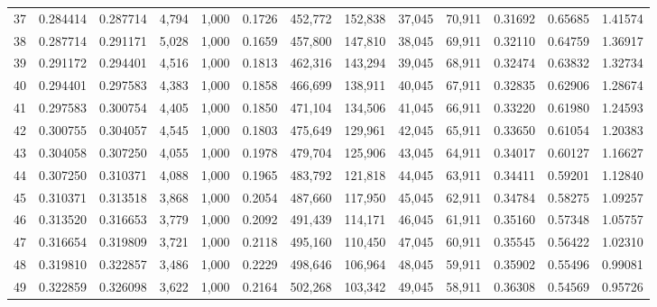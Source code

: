 \begin{tabular}{rrrrrrrrrrrrr}
37  &  0.284414 &  0.287714 &   4,794 &  1,000 &                                     0.1726 &  452,772 &  152,838 &   37,045 &   70,911 &  0.31692 &  0.65685 &  1.41574 \\
38  &  0.287714 &  0.291171 &   5,028 &  1,000 &                                     0.1659 &  457,800 &  147,810 &   38,045 &   69,911 &  0.32110 &  0.64759 &  1.36917 \\
39  &  0.291172 &  0.294401 &   4,516 &  1,000 &                                     0.1813 &  462,316 &  143,294 &   39,045 &   68,911 &  0.32474 &  0.63832 &  1.32734 \\
40  &  0.294401 &  0.297583 &   4,383 &  1,000 &                                     0.1858 &  466,699 &  138,911 &   40,045 &   67,911 &  0.32835 &  0.62906 &  1.28674 \\
41  &  0.297583 &  0.300754 &   4,405 &  1,000 &                                     0.1850 &  471,104 &  134,506 &   41,045 &   66,911 &  0.33220 &  0.61980 &  1.24593 \\
42  &  0.300755 &  0.304057 &   4,545 &  1,000 &                                     0.1803 &  475,649 &  129,961 &   42,045 &   65,911 &  0.33650 &  0.61054 &  1.20383 \\
43  &  0.304058 &  0.307250 &   4,055 &  1,000 &                                     0.1978 &  479,704 &  125,906 &   43,045 &   64,911 &  0.34017 &  0.60127 &  1.16627 \\
44  &  0.307250 &  0.310371 &   4,088 &  1,000 &                                     0.1965 &  483,792 &  121,818 &   44,045 &   63,911 &  0.34411 &  0.59201 &  1.12840 \\
45  &  0.310371 &  0.313518 &   3,868 &  1,000 &                                     0.2054 &  487,660 &  117,950 &   45,045 &   62,911 &  0.34784 &  0.58275 &  1.09257 \\
46  &  0.313520 &  0.316653 &   3,779 &  1,000 &                                     0.2092 &  491,439 &  114,171 &   46,045 &   61,911 &  0.35160 &  0.57348 &  1.05757 \\
47  &  0.316654 &  0.319809 &   3,721 &  1,000 &                                     0.2118 &  495,160 &  110,450 &   47,045 &   60,911 &  0.35545 &  0.56422 &  1.02310 \\
48  &  0.319810 &  0.322857 &   3,486 &  1,000 &                                     0.2229 &  498,646 &  106,964 &   48,045 &   59,911 &  0.35902 &  0.55496 &  0.99081 \\
49  &  0.322859 &  0.326098 &   3,622 &  1,000 &                                     0.2164 &  502,268 &  103,342 &   49,045 &   58,911 &  0.36308 &  0.54569 &  0.95726 \\

\end{tabular}
